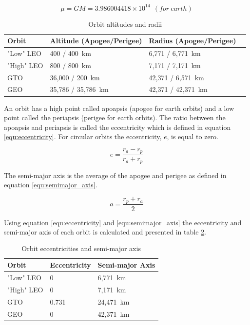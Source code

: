 \documentclass[a4paper, article, oneside, UKenglish]{memoir}
\newcommand{\0}{\mathbf{0}}
\newcommand{\1}{\mathbf{1}}
\begin{document}
\begin{equation}
\mu = GM = 3.986004418 \times 10^{14} ~~ (for ~ earth)
\label{equ:mu_definition}
\end{equation}

\begin{table}[h]
\centering
\begin{tabular}{@{}llll@{}}
\toprule
Orbit 		& Altitude (Apogee/Perigee)	& Radius (Apogee/Perigee) \\ \midrule
"Low" LEO   & 400 / 400~km				& 6,771 / 6,771~km   	\\
"High" LEO	& 800 / 800~km				& 7,171 / 7,171~km      \\
GTO      	& 36,000 /  200~km			& 42,371 / 6,571~km		\\
GEO      	& 35,786 / 35,786~km		& 42,371 / 42,371~km     \\ \bottomrule
\end{tabular}
\captionsetup{justification=centering}
\caption{Orbit altitudes and radii}
\label{tab:orbital_altitudes}
\end{table}

An orbit has a high point called apoapsis (apogee for earth orbits) and a low point called the periapsis (perigee for earth orbits).  The ratio between the apoapsis and periapsis is called the eccentricity which is defined in equation \ref{equ:eccentricity}.  For circular orbits the eccentricity, $e$, is equal to zero.

\begin{equation}
e = \frac{ r_a - r_p }{ r_a + r_p }
\label{equ:eccentricity}
\end{equation}

The semi-major axis is the average of the apogee and perigee as defined in equation \ref{equ:semimajor_axis}.

\begin{equation}
a = \frac{r_p + r_a}{2}
\label{equ:semimajor_axis}
\end{equation}

Using equation \ref{equ:eccentricity} and \ref{equ:semimajor_axis} the eccentricity and semi-major axis of each orbit is calculated and presented in table \ref{tab:orbital_eccentricities}.

\begin{table}[h]
\centering
\begin{tabular}{@{}lll@{}}
\toprule
Orbit 		& Eccentricity	& Semi-major Axis	\\ \midrule
"Low" LEO   & 0				& 6,771~km			\\
"High" LEO	& 0				& 7,171~km			\\
GTO      	& 0.731			& 24,471~km			\\
GEO      	& 0				& 42,371~km			\\ \bottomrule
\end{tabular}
\captionsetup{justification=centering}
\caption{Orbit eccentricities and semi-major axis}
\label{tab:orbital_eccentricities}
\end{table}
\end{document}
